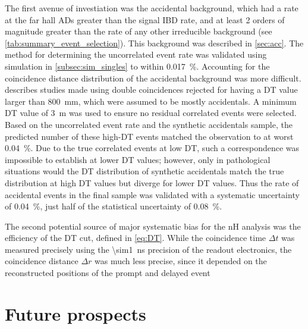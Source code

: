 The first avenue of investiation was the accidental background,
which had a rate at the far hall ADs greater than the signal IBD rate,
and at least 2 orders of magnitude greater than the rate
of any other irreducible background (see \cref{tab:summary_event_selection}).
This background was described in \cref{sec:acc}.
The method for determining the uncorrelated event rate
was validated using simulation in \cref{subsec:sim_singles}
to within \SI{0.017}{\percent}.
Accounting for the coincidence distance distribution of the accidental background
was more difficult.
 describes studies made using double coincidences
rejected for having a DT value larger than \SI{800}{\mm},
which were assumed to be mostly accidentals.
A minimum DT value of \SI{3}{\m} was used to ensure no residual correlated events
were selected.
Based on the uncorrelated event rate and the synthetic accidentals sample,
the predicted number of these high-DT events matched the observation
to at worst \SI{0.04}{\percent}.
Due to the true correlated events at low DT, such a correspondence
was impossible to establish at lower DT values;
however, only in pathological situations
would the DT distribution of synthetic accidentals match the true distribution
at high DT values but diverge for lower DT values.
Thus the rate of accidental events in the final sample
was validated with a systematic uncertainty of \SI{0.04}{\percent},
just half of the statistical uncertainty of \SI{0.08}{\percent}.

The second potential source of major systematic bias for the nH analysis
was the efficiency of the DT cut, defined in \cref{eq:DT}.
While the coincidence time $\Delta t$ was measured precisely
using the \SI{\sim1}{\ns} precision of the readout electronics,
the coincidence distance $\Delta r$ was much less precise,
since it depended on the reconstructed positions of the prompt and delayed event



\section{Future prospects}
\label{sec:future}
